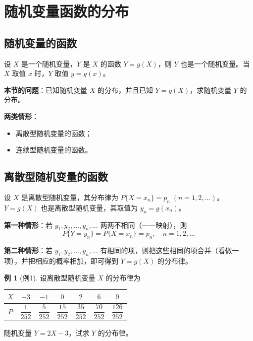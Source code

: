 \documentclass[11pt,a4paper]{report}
\theoremstyle{definition}
\newtheorem{example}{例}[chapter]
\begin{document}
\section{随机变量函数的分布}

\subsection{随机变量的函数}

设 $X$ 是一个随机变量，$Y$ 是 $X$ 的函数 $Y=g(X)$，则 $Y$ 也是一个随机变量。当 $X$ 取值 $x$ 时，$Y$ 取值 $y=g(x)$。

\textbf{本节的问题}：已知随机变量 $X$ 的分布，并且已知 $Y=g(X)$，求随机变量 $Y$ 的分布。

\textbf{两类情形}：
\begin{itemize}[leftmargin=2em]
    \item 离散型随机变量的函数；
    \item 连续型随机变量的函数。
\end{itemize}

\subsection{离散型随机变量的函数}

设 $X$ 是离散型随机变量，其分布律为 $P\{X=x_n\}=p_n\;(n=1,2,\dots)$。$Y=g(X)$ 也是离散型随机变量，其取值为 $y_n=g(x_n)$。

\textbf{第一种情形}：若 $y_1,y_2,\dots,y_n,\dots$ 两两不相同（一一映射），则
\[
P\{Y=y_n\} = P\{X=x_n\} = p_n, \quad n=1,2,\dots
\]

\textbf{第二种情形}：若 $y_1,y_2,\dots,y_n,\dots$ 有相同的项，则把这些相同的项合并（看做一项），并把相应的概率相加，即可得到 $Y=g(X)$ 的分布律。

\begin{example}[例1]
设离散型随机变量 $X$ 的分布律为
\begin{table}[htbp]
\centering
\begin{tabular}{@{}ccccccc@{}}
\toprule
$X$ & $-3$ & $-1$ & $0$ & $2$ & $6$ & $9$ \\
\midrule
$P$ & $\dfrac{1}{252}$ & $\dfrac{5}{252}$ & $\dfrac{15}{252}$ & $\dfrac{35}{252}$ & $\dfrac{70}{252}$ & $\dfrac{126}{252}$ \\
\bottomrule
\end{tabular}
\end{table}
随机变量 $Y=2X-3$，试求 $Y$ 的分布律。
\end{example}
\end{document}
